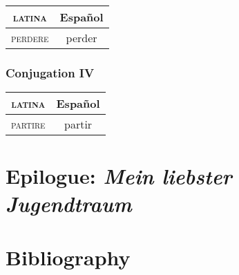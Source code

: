 \documentclass{report}
\begin{document}
\begin{tabular}{|c|c|}
  \hline
  \textsc{latina} & Español \\
  \hline
  \textsc{perdere} & perder \\
  \hline
\end{tabular}

\subsection{Conjugation IV}

\begin{tabular}{|c|c|}
  \hline
  \textsc{latina} & Español \\
  \hline
  \textsc{partire} & partir \\
  \hline
\end{tabular}

\chapter*{Epilogue: \emph{Mein liebster Jugendtraum}}

\nocite{*}

\chapter*{Bibliography}

\printbibliography[heading=subbibintoc, keyword=romance, title={Romance Linguistics}]
\end{document}
